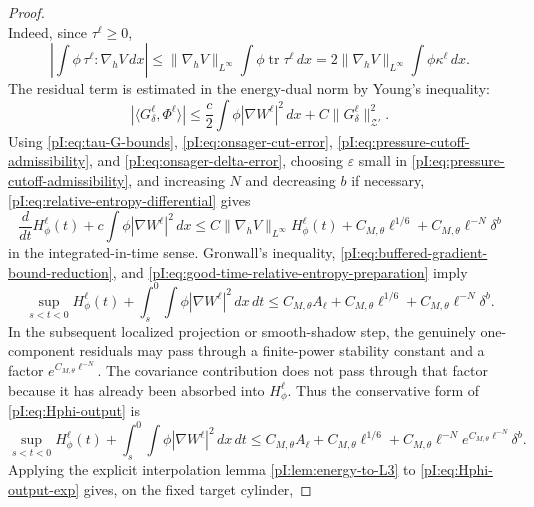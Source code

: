 \documentclass[11pt]{article}
\numberwithin{equation}{section}
\theoremstyle{plain}
\theoremstyle{definition}
\theoremstyle{remark}
\newcommand{\nabh}{\nabla_h}
\begin{document}
\begin{proof}
\begin{equation}
\end{equation}
Indeed, since \(\tau^\ell\ge0\),
\[
        \left|\int\phi\,\tau^\ell:\nabh V\,dx\right|
        \le
        \|\nabh V\|_{L^\infty}\int\phi\operatorname{tr}\tau^\ell\,dx
        =2\|\nabh V\|_{L^\infty}\int\phi\kappa^\ell\,dx.
\]
The residual term is estimated in the energy-dual norm by Young's inequality:
\[
        |\langle G_\delta^\ell,\Phi^\ell\rangle|
        \le
        \frac c2\int\phi|\nabla W^\ell|^2\,dx
        +C\|G_\delta^\ell\|_{\mathcal Z'}^2.
\]
Using \eqref{pI:eq:tau-G-bounds}, \eqref{pI:eq:onsager-cut-error}, \eqref{pI:eq:pressure-cutoff-admissibility}, and \eqref{pI:eq:onsager-delta-error}, choosing \(\varepsilon\) small in \eqref{pI:eq:pressure-cutoff-admissibility}, and increasing \(N\) and decreasing \(b\) if necessary, \eqref{pI:eq:relative-entropy-differential} gives
\begin{equation}\label{pI:eq:relative-entropy-gronwall-input}
        \frac{d}{dt}H_\phi^\ell(t)
        +c\int\phi|\nabla W^\ell|^2\,dx
        \le
        C\|\nabh V\|_{L^\infty}H_\phi^\ell(t)
        +C_{M,\theta}\ell^{1/6}
        +C_{M,\theta}\ell^{-N}\delta^b
\end{equation}
in the integrated-in-time sense.  Gronwall's inequality, \eqref{pI:eq:buffered-gradient-bound-reduction}, and \eqref{pI:eq:good-time-relative-entropy-preparation} imply
\begin{equation}\label{pI:eq:Hphi-output}
        \sup_{s<t<0}H_\phi^\ell(t)
        +\int_s^0\int\phi|\nabla W^\ell|^2\,dx\,dt
        \le
        C_{M,\theta}A_\ell
        +C_{M,\theta}\ell^{1/6}
        +C_{M,\theta}\ell^{-N}\delta^b .
\end{equation}
In the subsequent localized projection or smooth-shadow step, the genuinely one-component residuals may pass through a finite-power stability constant and a factor \(e^{C_{M,\theta}\ell^{-N}}\).  The covariance contribution does not pass through that factor because it has already been absorbed into \(H_\phi^\ell\).  Thus the conservative form of \eqref{pI:eq:Hphi-output} is
\begin{equation}\label{pI:eq:Hphi-output-exp}
        \sup_{s<t<0}H_\phi^\ell(t)
        +\int_s^0\int\phi|\nabla W^\ell|^2\,dx\,dt
        \le
        C_{M,\theta}A_\ell
        +C_{M,\theta}\ell^{1/6}
        +C_{M,\theta}\ell^{-N}e^{C_{M,\theta}\ell^{-N}}\delta^b .
\end{equation}
Applying the explicit interpolation lemma \cref{pI:lem:energy-to-L3} to \eqref{pI:eq:Hphi-output-exp} gives, on the fixed target cylinder,

\end{proof}
\end{document}
